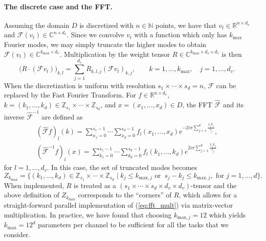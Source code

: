 \documentclass{article} %
\newcommand{\R}{\mathbb{R}}
\newcommand{\C}{\mathbb{C}}
\newcommand{\cG}{\mathcal{F}}
\newcommand{\bbZ}{\mathbb{Z}}
\begin{document}
\paragraph{The discrete case and the FFT.}
Assuming the domain $D$ is discretized with $n \in \mathbb{N}$ points, we have that $v_t \in \R^{n \times d_v}$ and $\cG (v_t) \in \C^{n \times d_v}$. Since we convolve $v_t$ with a function which only has $k_{\text{max}}$ Fourier modes, we may simply truncate the higher modes to obtain $\cG (v_t) \in \C^{k_{\text{max}} \times d_v}$. Multiplication by the weight tensor $R \in \C^{k_{\text{max}} \times d_v \times d_v}$ is then
\begin{equation}
\label{eq:fft_mult}
\bigl( R \cdot (\cG v_t) \bigr)_{k,l} = \sum_{j=1}^{d_v} R_{k,l,j}  (\cG v_t)_{k,j}, \qquad k=1,\dots,k_{\text{max}}, \quad j=1,\dots,d_v.
\end{equation}
When the discretization is uniform with resolution \(s_1 \times  \cdots \times s_d = n\), $\cG$ can be replaced by the Fast Fourier Transform. For $f \in \R^{n \times d_v}$,   $k = (k_1, \ldots, k_{d}) \in \bbZ_{s_1} \times \cdots \times \bbZ_{s_d}$, and $x=(x_1, \ldots, x_{d}) \in D$, the FFT $\hat{\cG}$ and its inverse $\hat{\cG}^{-1}$ are defined as
\begin{align*}
    (\hat{\cG} f)_l(k) = \sum_{x_1=0}^{s_1-1} \cdots \sum_{x_{d}=0}^{s_d-1} f_l(x_1, \ldots, x_{d}) e^{- 2i \pi \sum_{j=1}^{d} \frac{x_j k_j}{s_j} }, \\
    (\hat{\cG}^{-1} f)_l(x) = \sum_{k_1=0}^{s_1-1} \cdots \sum_{k_{d}=0}^{s_d-1} f_l(k_1, \ldots, k_{d}) e^{2i \pi \sum_{j=1}^{d} \frac{x_j k_j}{s_j} }
\end{align*}
for $l=1,\dots,d_v$. 
In this case, the set of truncated modes becomes
\[Z_{k_{\text{max}}} = \{(k_1, \ldots, k_{d}) \in \bbZ_{s_1} \times \cdots \times \bbZ_{s_d} \mid k_j \leq k_{\text{max},j} \text{ or }\ s_j-k_j \leq k_{\text{max},j}, \text{ for } j=1,\dots,d\}.\]
When implemented, $R$ is treated as a $(s_1 \times \cdots \times s_d \times d_v \times d_v)$-tensor and the above definition of $Z_{k_{\text{max}}}$ corresponds to the ``corners'' of $R$, which allows for a straight-forward parallel implementation of (\ref{eq:fft_mult}) via matrix-vector multiplication. 
In practice, we have found that choosing $k_{\text{max},j} = 12$  which yields $k_{\text{max}} = 12^d$ parameters per channel to be sufficient for all the tasks that we consider.
\end{document}
